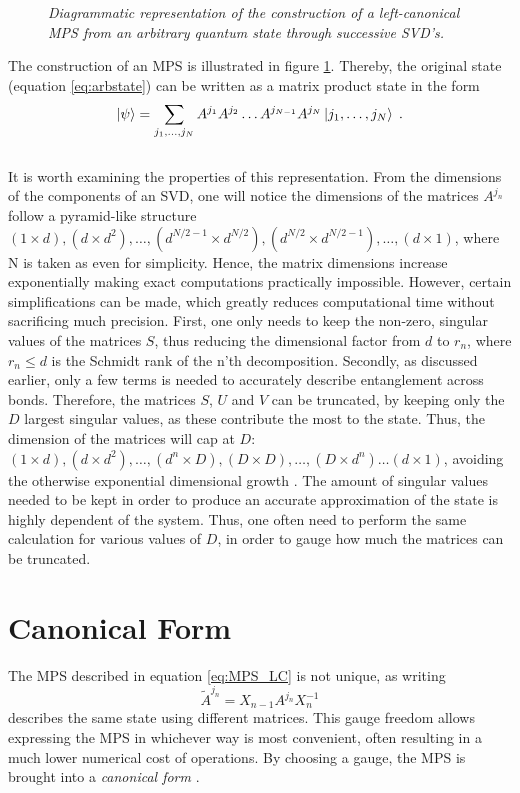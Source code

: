 \begin{figure}[h!]
	\centering
	
	\caption{\textit{Diagrammatic representation of the construction of a left-canonical MPS from an arbitrary quantum state through successive SVD's.}}
	\label{fig:MPSbuild}
\end{figure}
The construction of an MPS is illustrated in figure \ref{fig:MPSbuild}. Thereby, the original state (equation \ref{eq:arbstate}) can be written as a matrix product state in the form \cite{Schollwock}
\begin{equation}
	\ket{\psi} = \sum_{j_1, \ldots, j_N} A^{j_1} A^{j_2} \ldots A^{j_{N-1}} A^{j_{N}} \ket{j_1, \ldots, j_N} \; .
	\label{eq:MPS_LC} 
\end{equation}
\\
It is worth examining the properties of this representation. From the dimensions of the components of an SVD, one will notice the dimensions of the matrices $A^{j_n}$ follow a pyramid-like structure $(1 \times d ),(d \times d^2) , \ldots , (d^{N/2 -1} \times d^{N/2}) , (d^{N/2} \times d^{N/2 -1 }), \ldots , (d \times 1)$, where N is taken as even for simplicity. Hence, the matrix dimensions increase exponentially making exact computations practically impossible. However, certain simplifications can be made, which greatly reduces computational time without sacrificing much precision. First, one only needs to keep the non-zero, singular values of the matrices $S$, thus reducing the dimensional factor from $d$ to $r_n$, where $r_n \leq d$ is the Schmidt rank of the n'th decomposition. Secondly, as discussed earlier, only a few terms is needed to accurately describe entanglement across bonds. Therefore, the matrices $S$, $U$ and $V$ can be truncated, by keeping only the $D$ largest singular values, as these contribute the most to the state. Thus, the dimension of the matrices will cap at $D$: $(1 \times d ),(d \times d^2) , \ldots , (d^{n} \times D) , (D \times D), \ldots , ( D \times d^{n}) \ldots  (d \times 1)$, avoiding the otherwise exponential dimensional growth \cite{EntropyScaling}. The amount of singular values needed to be kept in order to produce an accurate approximation of the state is highly dependent of the system. Thus, one often need to perform the same calculation for various values of $D$, in order to gauge how much the matrices can be truncated.


\section{Canonical Form}
The MPS described in equation \ref{eq:MPS_LC} is not unique, as writing 
\begin{equation}
	\tilde{A}^{j_n} = X_{n-1} A^{j_n} X_{n}^{-1}
\end{equation}
describes the same state using different matrices. This gauge freedom allows expressing the MPS in whichever way is most convenient, often resulting in a much lower numerical cost of operations. By choosing a gauge, the MPS is brought into a \textit{canonical form} \cite{Vidal}.

